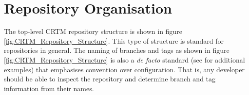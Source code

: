 \section{Repository Organisation}
The top-level CRTM repository structure is shown in figure \ref{fig:CRTM_Repository_Structure}. This type of structure is standard for repositories in general\cite{ref:svnbook1,ref:svnbook2}. The naming of branches and tags as shown in figure \ref{fig:CRTM_Repository_Structure} is also a \textit{de facto} standard (see \cite{ref:svnbook2} for additional examples) that emphasises convention over configuration. That is, any developer should be able to inspect the repository and determine branch and tag information from their names.
\begin{figure}[htp]
  \hfill
  \begin{minipage}[t]{.475\textwidth}
    \begin{center}

\end{center}
\end{minipage}
\end{figure}
